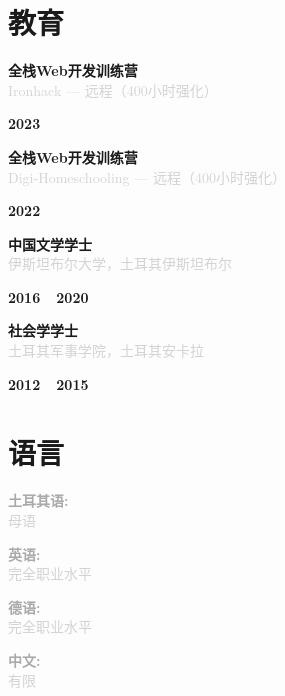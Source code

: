 \documentclass[10pt,a4paper]{article}
\newcommand{\Education}[3]{%
  \vspace{2pt}
  \noindent
  \begin{minipage}[t]{0.70\textwidth}
    {\normalsize\textbf{\color{darkgray}#1}} \\
    \textcolor{lightgray}{\small #2}
  \end{minipage}%
  \hfill
  \begin{minipage}[t]{0.28\textwidth}
    \raggedleft{}
    \textcolor{mediumgray}{\small\textbf{#3}}
  \end{minipage}
  \vspace{1pt}
}
\begin{document}
\section*{教育}

\Education{全栈Web开发训练营}{Ironhack --- 远程（400小时强化）}{2023}

\Education{全栈Web开发训练营}{Digi-Homeschooling --- 远程（400小时强化）}{2022}

\Education{中国文学学士}{伊斯坦布尔大学，土耳其伊斯坦布尔}{2016~\textendash~2020}

\Education{社会学学士}{土耳其军事学院，土耳其安卡拉}{2012~\textendash~2015}

\section*{语言}

\vspace{1pt}
\noindent
\begin{minipage}[t]{0.24\textwidth}
  \textcolor{darkgray}{\textbf{土耳其语:}} \\
  \textcolor{lightgray}{\small 母语}
\end{minipage}%
\hfill
\begin{minipage}[t]{0.24\textwidth}
  \textcolor{darkgray}{\textbf{英语:}} \\
  \textcolor{lightgray}{\small 完全职业水平}
\end{minipage}%
\hfill
\begin{minipage}[t]{0.24\textwidth}
  \textcolor{darkgray}{\textbf{德语:}} \\
  \textcolor{lightgray}{\small 完全职业水平}
\end{minipage}%
\hfill
\begin{minipage}[t]{0.24\textwidth}
  \textcolor{darkgray}{\textbf{中文:}} \\
  \textcolor{lightgray}{\small 有限}
\end{minipage}
\end{document}
